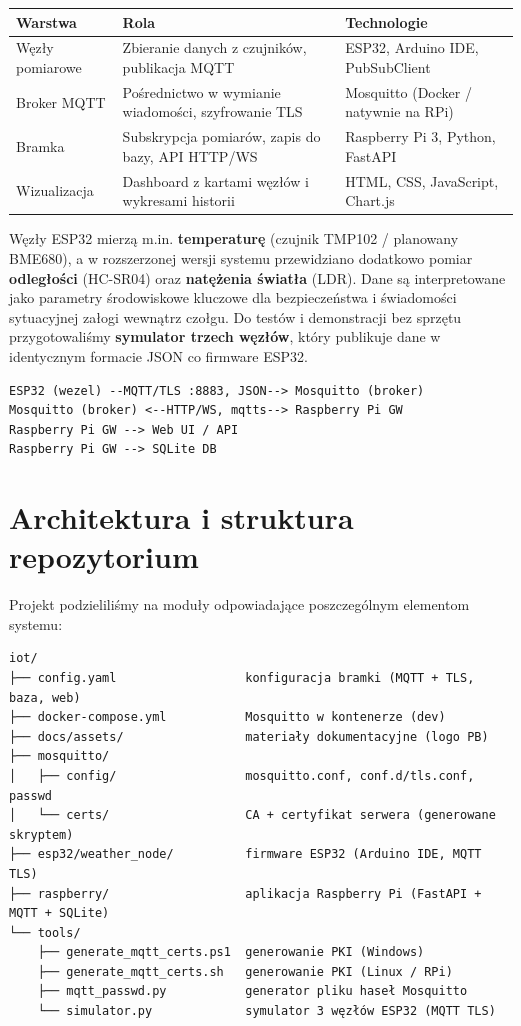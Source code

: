 \documentclass[12pt, a4paper]{article}
\begin{document}
\begin{table}[htbp]
    \centering
    \renewcommand{\arraystretch}{1.3}
    \begin{tabularx}{\textwidth}{@{} >{\raggedright\arraybackslash}p{3cm} >{\raggedright\arraybackslash}p{5cm} X @{}}
        \toprule
        \textbf{Warstwa} & \textbf{Rola} & \textbf{Technologie} \\
        \midrule
        Węzły pomiarowe & Zbieranie danych z czujników, publikacja MQTT & ESP32, Arduino IDE, PubSubClient \\
        Broker MQTT & Pośrednictwo w wymianie wiadomości, szyfrowanie TLS & Mosquitto (Docker / natywnie na RPi) \\
        Bramka & Subskrypcja pomiarów, zapis do bazy, API HTTP/WS & Raspberry Pi 3, Python, FastAPI \\
        Wizualizacja & Dashboard z kartami węzłów i wykresami historii & HTML, CSS, JavaScript, Chart.js \\
        \bottomrule
    \end{tabularx}
\end{table}

Węzły ESP32 mierzą m.in. \textbf{temperaturę} (czujnik TMP102 / planowany BME680), a w rozszerzonej wersji systemu przewidziano dodatkowo pomiar \textbf{odległości} (HC-SR04) oraz \textbf{natężenia światła} (LDR). Dane są interpretowane jako parametry środowiskowe kluczowe dla bezpieczeństwa i świadomości sytuacyjnej załogi wewnątrz czołgu. Do testów i demonstracji bez sprzętu przygotowaliśmy \textbf{symulator trzech węzłów}, który publikuje dane w identycznym formacie JSON co firmware ESP32.

\begin{verbatim}
ESP32 (wezel) --MQTT/TLS :8883, JSON--> Mosquitto (broker)
Mosquitto (broker) <--HTTP/WS, mqtts--> Raspberry Pi GW
Raspberry Pi GW --> Web UI / API
Raspberry Pi GW --> SQLite DB
\end{verbatim}

\section{Architektura i struktura repozytorium}
Projekt podzieliliśmy na moduły odpowiadające poszczególnym elementom systemu:

\begin{verbatim}
iot/
├── config.yaml                  konfiguracja bramki (MQTT + TLS, baza, web)
├── docker-compose.yml           Mosquitto w kontenerze (dev)
├── docs/assets/                 materiały dokumentacyjne (logo PB)
├── mosquitto/
│   ├── config/                  mosquitto.conf, conf.d/tls.conf, passwd
│   └── certs/                   CA + certyfikat serwera (generowane skryptem)
├── esp32/weather_node/          firmware ESP32 (Arduino IDE, MQTT TLS)
├── raspberry/                   aplikacja Raspberry Pi (FastAPI + MQTT + SQLite)
└── tools/
    ├── generate_mqtt_certs.ps1  generowanie PKI (Windows)
    ├── generate_mqtt_certs.sh   generowanie PKI (Linux / RPi)
    ├── mqtt_passwd.py           generator pliku haseł Mosquitto
    └── simulator.py             symulator 3 węzłów ESP32 (MQTT TLS)
\end{verbatim}
\end{document}
